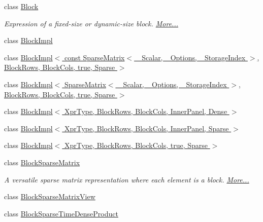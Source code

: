 \begin{DoxyCompactItemize}
class \hyperlink{group___core___module_class_eigen_1_1_block}{Block}
\begin{DoxyCompactList}\small\item\em Expression of a fixed-\/size or dynamic-\/size block.  \hyperlink{group___core___module_class_eigen_1_1_block}{More...}\end{DoxyCompactList}\item 
class \hyperlink{class_eigen_1_1_block_impl}{Block\+Impl}
\item 
class \hyperlink{class_eigen_1_1_block_impl_3_01const_01_sparse_matrix_3_01___scalar_00_01___options_00_01___store3fd33d94eaf95572721ac85ec6beb63}{Block\+Impl$<$ const Sparse\+Matrix$<$ \+\_\+\+Scalar, \+\_\+\+Options, \+\_\+\+Storage\+Index $>$, Block\+Rows, Block\+Cols, true, Sparse $>$}
\item 
class \hyperlink{class_eigen_1_1_block_impl_3_01_sparse_matrix_3_01___scalar_00_01___options_00_01___storage_inded3daac10033a16d6ca9aea81cdfe7eee}{Block\+Impl$<$ Sparse\+Matrix$<$ \+\_\+\+Scalar, \+\_\+\+Options, \+\_\+\+Storage\+Index $>$, Block\+Rows, Block\+Cols, true, Sparse $>$}
\item 
class \hyperlink{class_eigen_1_1_block_impl_3_01_xpr_type_00_01_block_rows_00_01_block_cols_00_01_inner_panel_00_01_dense_01_4}{Block\+Impl$<$ Xpr\+Type, Block\+Rows, Block\+Cols, Inner\+Panel, Dense $>$}
\item 
class \hyperlink{class_eigen_1_1_block_impl_3_01_xpr_type_00_01_block_rows_00_01_block_cols_00_01_inner_panel_00_01_sparse_01_4}{Block\+Impl$<$ Xpr\+Type, Block\+Rows, Block\+Cols, Inner\+Panel, Sparse $>$}
\item 
class \hyperlink{class_eigen_1_1_block_impl_3_01_xpr_type_00_01_block_rows_00_01_block_cols_00_01true_00_01_sparse_01_4}{Block\+Impl$<$ Xpr\+Type, Block\+Rows, Block\+Cols, true, Sparse $>$}
\item 
class \hyperlink{group___sparse_core___module_class_eigen_1_1_block_sparse_matrix}{Block\+Sparse\+Matrix}
\begin{DoxyCompactList}\small\item\em A versatile sparse matrix representation where each element is a block.  \hyperlink{group___sparse_core___module_class_eigen_1_1_block_sparse_matrix}{More...}\end{DoxyCompactList}\item 
class \hyperlink{class_eigen_1_1_block_sparse_matrix_view}{Block\+Sparse\+Matrix\+View}
\item 
class \hyperlink{class_eigen_1_1_block_sparse_time_dense_product}{Block\+Sparse\+Time\+Dense\+Product}

\end{DoxyCompactItemize}
